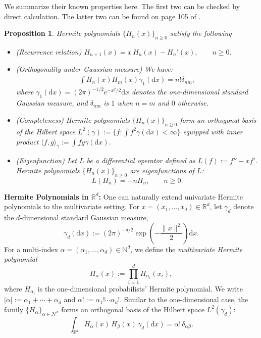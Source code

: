 \documentclass[12pt]{article}
\newcommand{\0}{\mathbf{0}}
\newcommand{\diff}{\mathrm{d}}
\newcommand{\R}{\mathbb{R}}
\newcommand{\N}{\mathcal{N}}
\newtheorem{prop}{Proposition}
\begin{document}
We summarize their known properties here. The first two can be checked by direct calculation.  The latter two can be found on page 105 of \cite{bakry2013analysis}.

\begin{prop}\label{prop:properties_1d_hermite}
Hermite polynomials $\{H_n(x)\}_{n\ge0}$ satisfy the following
    \begin{itemize}
        \item (Recurrence relation) $H_{n+1}(x)=x\,H_n(x)-H_n'(x),\qquad n\ge0.$
        \item (Orthogonality under Gaussian measure) We have:
        \begin{align*}
            \int H_n(x) H_m(x) \gamma_1(\diff x) =  n! \delta_{nm},
        \end{align*}
        where $\gamma_1(\diff x) = (2\pi)^{-1/2} e^{-x^2/2}\diff x$ denotes the one-dimensional standard Gaussian measure, and $\delta_{nm}$ is $1$ when $n=m$ and $0$ otherwise.
        \item (Completeness) Hermite polynomials $\{H_n(x)\}_{n\ge0}$ form an orthogonal basis of the Hilbert space $L^2(\gamma) := \{f: \int f^2 \gamma(\diff x) <\infty\}$ equipped with inner product
 $\langle f, g \rangle_\gamma := \int f g \gamma(\diff x)$.
        \item (Eigenfunction) Let $L$ be a differential operator defined as $L(f) := f'' - x f'$. Hermite polynomials $\{H_n(x)\}_{n\ge0}$ are eigenfunctions of $L$:
        $$L(H_n) = -n H_n, \qquad n\ge 0.$$
    \end{itemize}
\end{prop}

\textbf{Hermite Polynomials in $\R^d$:} One can naturally extend univariate Hermite polynomials to the multivariate setting. For $x=(x_1,\ldots,x_d)\in\R^d$, let $\gamma_d$ denote the $d$-dimensional standard Gaussian measure,
\[
\gamma_d(\diff x)
	:= (2\pi)^{-d/2}\exp\!\left(-\frac{\|x\|^2}{2}\right)\diff x.
\]
For a multi-index $\alpha=(\alpha_1,\ldots,\alpha_d)\in\mathbb N^d$, we define the \emph{multivariate Hermite polynomial}
\[
H_\alpha(x)
	:= \prod_{i=1}^d H_{\alpha_i}(x_i),
\]
where $H_{\alpha_i}$ is the one-dimensional probabilists' Hermite polynomial.
We write $|\alpha|:=\alpha_1+\cdots+\alpha_d$ and
$\alpha!:=\alpha_1!\cdots\alpha_d!$. Similar to the one-dimensional case, the family $\{H_\alpha\}_{\alpha\in\N^d}$ forms an orthogonal basis of the Hilbert space
$L^2(\gamma_d)$:
\[
\int_{\R^d} H_\alpha(x)\,H_\beta(x)\,\gamma_d(\diff x)
	= \alpha!\,\delta_{\alpha\beta}.
\]
\end{document}
